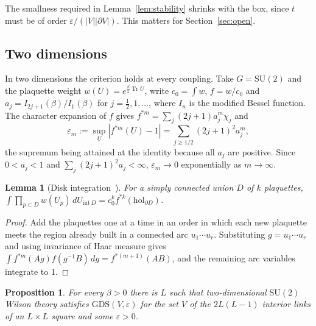 \documentclass[11pt]{amsart}
\newtheorem{lemma}[theorem]{Lemma}
\newtheorem{proposition}[theorem]{Proposition}
\theoremstyle{definition}
\theoremstyle{remark}
\newcommand{\SU}{\mathrm{SU}}
\newcommand{\Tr}{\operatorname{Tr}}
\begin{document}
The smallness required in Lemma~\ref{lem:stability} shrinks with the box,
since $t$ must be of order $\varepsilon/(|V||\partial V|)$. This matters for
Section~\ref{sec:open}.

\subsection{Two dimensions}

In two dimensions the criterion holds at every coupling. Take $G=\SU(2)$ and
the plaquette weight $w(U)=e^{\frac\beta2\Tr U}$, write $c_0=\int w$, $f=w/c_0$
and $a_j=I_{2j+1}(\beta)/I_1(\beta)$ for $j=\frac12,1,\dots$, where $I_n$ is the
modified Bessel function. The character expansion of $f$ gives
$f^{*m}=\sum_j(2j+1)a_j^m\chi_j$ and
\[
\varepsilon_m:=\sup_U|f^{*m}(U)-1|=\sum_{j\ge1/2}(2j+1)^2a_j^m,
\]
the supremum being attained at the identity because all $a_j$ are positive.
Since $0<a_j<1$ and $\sum_j(2j+1)^2a_j<\infty$, $\varepsilon_m\to0$
exponentially as $m\to\infty$.

\begin{lemma}[Disk integration~\cite{Mig75,Lev03}]\label{lem:disk}
For a simply connected union $D$ of $k$ plaquettes,
$\int\prod_{p\subset D}w(U_p)\,dU_{\mathrm{int}\,D}=c_0^kf^{*k}(\mathrm{hol}_{
\partial D})$.
\end{lemma}

\begin{proof}
Add the plaquettes one at a time in an order in which each new plaquette meets
the region already built in a connected arc $u_1\cdots u_r$. Substituting
$g=u_1\cdots u_r$ and using invariance of Haar measure gives $\int f^{*m}(Ag)
f(g^{-1}B)\,dg=f^{*(m+1)}(AB)$, and the remaining arc variables integrate to
$1$.
\end{proof}

\begin{proposition}\label{prop:2d}
For every $\beta>0$ there is $L$ such that two-dimensional $\SU(2)$ Wilson
theory satisfies $\mathrm{GDS}(V,\varepsilon)$ for the set $V$ of the
$2L(L-1)$ interior links of an $L\times L$ square and some $\varepsilon>0$.
\end{proposition}
\end{document}
